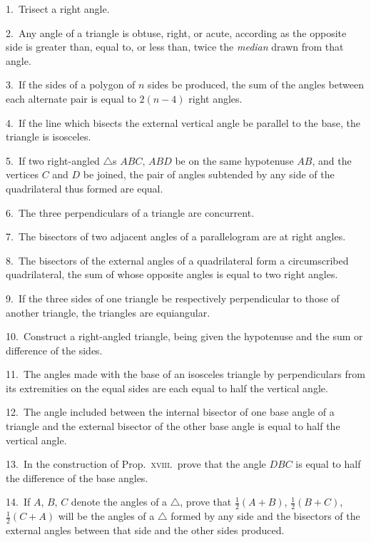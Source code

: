 \documentclass[oneside]{book}
\begin{document}
\begin{footnotesize}
1.~Trisect a right angle.

2.~Any angle of a triangle is obtuse, right, or acute, according
as the opposite side is greater than, equal to, or less than, twice
the \emph{median} drawn from that angle.

3.~If the sides of a polygon of $n$ sides be produced, the sum of
the angles between each alternate pair is equal to $2(n-4)$ right
angles.

4.~If the line which bisects the external vertical angle be
parallel to the base, the triangle is isosceles.

5.~If two right-angled $\triangle$s $ABC$, $ABD$ be on the same hypotenuse
$AB$, and the vertices $C$ and $D$ be joined, the pair of angles
subtended by any side of the quadrilateral thus formed are equal.

6.~The three perpendiculars of a triangle are concurrent.



7.~The bisectors of two adjacent angles of a parallelogram are
at right angles.

8.~The bisectors of the external angles of a quadrilateral form a
circumscribed quadrilateral, the sum of whose opposite angles is
equal to two right angles.

9.~If the three sides of one triangle be respectively perpendicular
to those of another triangle, the triangles are equiangular.

10.~Construct a right-angled triangle, being given the hypotenuse
and the sum or difference of the sides.

11.~The angles made with the base of an isosceles triangle by
perpendiculars from its extremities on the equal sides are each
equal to half the vertical angle.

12.~The angle included between the internal bisector of one
base angle of a triangle and the external bisector of the other base
angle is equal to half the vertical angle.

13.~In the construction of Prop.\ \textsc{xviii.}\ prove that the angle
$DBC$ is equal to half the difference of the base angles.

14.~If $A$, $B$, $C$ denote the angles of a $\triangle$, prove that $\frac{1}{2} (A + B)$,
$\frac{1}{2} (B + C)$, $\frac{1}{2} (C + A)$ will be the angles of a $\triangle$ formed by any
side and the bisectors of the external angles between that side and
the other sides produced.
\par\end{footnotesize}
\end{document}

